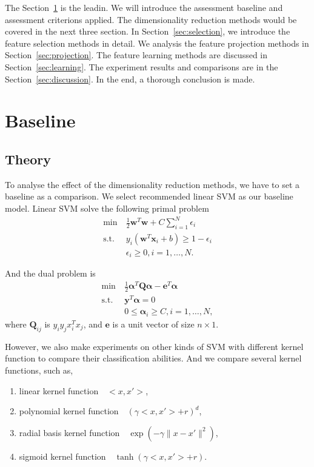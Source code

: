 \documentclass{article}
\newcommand{\Qmat}[0]{{{\boldsymbol Q}}}
\newcommand{\ev}[0]{{\boldsymbol{e}}}
\newcommand{\wv}{\boldsymbol{w}}
\newcommand{\xv}{\boldsymbol{x}}
\newcommand{\yv}{\boldsymbol{y}}
\newcommand{\alphav}{\boldsymbol{\alpha}}
\DeclareMathOperator{\mst}{s.t.}
\begin{document}
The Section~\ref{sec:baseline} is the leadin. We will introduce the assessment baseline and assessment criterions applied. The dimensionality reduction methods would be covered in the next three section. In Section~\ref{sec:selection}, we introduce the feature selection methods in detail. We analysis the feature projection methods in Section~\ref{sec:projection}. The feature learning methods are discussed in Section~\ref{sec:learning}. The experiment results and comparisons are in the Section~\ref{sec:discussion}.  In the end, a thorough conclusion is made.


\section{Baseline}
\label{sec:baseline}
\subsection{Theory}
To analyse the effect of the dimensionality reduction methods, we have to set a baseline as a comparison. We select recommended linear SVM as our baseline model. Linear SVM solve the following primal problem
\begin{equation}
	\label{eq:lsvm}
	\begin{split}
		\min~&\frac{1}{2} \wv^T\wv + C\sum_{i=1}^{N} \epsilon_i\\
		\mst~&y_i(\wv^T\xv_i+b)\geq 1-\epsilon_i\\
		     &\epsilon_i\geq0, i =1,\ldots,N.
	\end{split}
\end{equation}

And the dual problem is
\begin{equation}
	\label{eq:lsvm_d}
	\begin{split}
		\min~&\frac{1}{2} \alphav^T\Qmat\alphav-\ev^T\alphav\\
		\mst~&\yv^T\alphav=0\\
			 &0\le\alphav_i\ge C, i=1,\ldots,N,
	\end{split}
\end{equation}
where $\Qmat_{ij}$ is $y_iy_jx_i^Tx_j$, and $\ev$ is a unit vector of size $n\times1$. 

However, we also make experiments on other kinds of SVM with different kernel function to compare their classification abilities. And we compare several kernel functions, such as,
\begin{enumerate}
	\item linear kernel function~~$<x,x'>$,
	\item polynomial kernel function~~$(\gamma<x,x'>+r)^d$,
	\item radial basis kernel function~~$\exp(-\gamma\|x-x'\|^2)$,
	\item sigmoid kernel function~~$\tanh(\gamma<x,x'>+r)$.
\end{enumerate}
\end{document}
